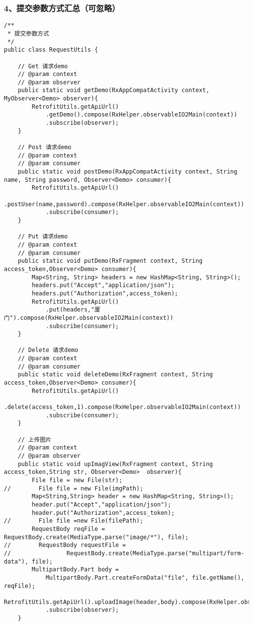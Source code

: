 \documentclass[9pt, b5paper]{article}
\begin{document}
\subsubsection{4、提交参数方式汇总（可忽略）}
\label{sec-18-4-4}
\begin{verbatim}
/**
 * 提交参数方式
 */
public class RequestUtils {

    // Get 请求demo
    // @param context
    // @param observer
    public static void getDemo(RxAppCompatActivity context, MyObserver<Demo> observer){
        RetrofitUtils.getApiUrl()
            .getDemo().compose(RxHelper.observableIO2Main(context))
            .subscribe(observer);
    }

    // Post 请求demo
    // @param context
    // @param consumer
    public static void postDemo(RxAppCompatActivity context, String name, String password, Observer<Demo> consumer){
        RetrofitUtils.getApiUrl()
            .postUser(name,password).compose(RxHelper.observableIO2Main(context))
            .subscribe(consumer);
    }

    // Put 请求demo
    // @param context
    // @param consumer
    public static void putDemo(RxFragment context, String access_token,Observer<Demo> consumer){
        Map<String, String> headers = new HashMap<String, String>();
        headers.put("Accept","application/json");
        headers.put("Authorization",access_token);
        RetrofitUtils.getApiUrl()
            .put(headers,"厦门").compose(RxHelper.observableIO2Main(context))
            .subscribe(consumer);
    }

    // Delete 请求demo
    // @param context
    // @param consumer
    public static void deleteDemo(RxFragment context, String access_token,Observer<Demo> consumer){
        RetrofitUtils.getApiUrl()
            .delete(access_token,1).compose(RxHelper.observableIO2Main(context))
            .subscribe(consumer);
    }

    // 上传图片
    // @param context
    // @param observer
    public static void upImagView(RxFragment context, String  access_token,String str, Observer<Demo>  observer){
        File file = new File(str);
//        File file = new File(imgPath);
        Map<String,String> header = new HashMap<String, String>();
        header.put("Accept","application/json");
        header.put("Authorization",access_token);
//        File file =new File(filePath);
        RequestBody reqFile = RequestBody.create(MediaType.parse("image/*"), file);
//        RequestBody requestFile =
//                RequestBody.create(MediaType.parse("multipart/form-data"), file);
        MultipartBody.Part body =
            MultipartBody.Part.createFormData("file", file.getName(), reqFile);
        RetrofitUtils.getApiUrl().uploadImage(header,body).compose(RxHelper.observableIO2Main(context))
            .subscribe(observer);
    }


\end{verbatim}
\end{document}

